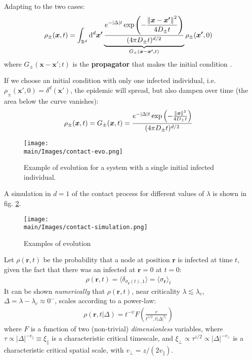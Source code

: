 \documentclass[../../main.tex]{subfiles}
\begin{document}
Adapting to the two cases:
\begin{align*}
    \rho_{\pm}(\bm{x}, t) = \int_{\mathbb{R}^d} \dd[d]{\bm{x'}} \underbrace{\frac{\displaystyle e^{-|\Delta|t} \exp\left(-\frac{\norm{\bm{x} - \bm{x'}}^2}{4 D_\pm t} \right)}{(4 \pi D_\pm t)^{d/2}}}_{G_\pm(\bm{x} - \bm{x'},t)}   \rho_{\pm}(\bm{x'},0)
\end{align*}
where $G_\pm(\bm{x}-\bm{x'};t)$ is the \textbf{propagator} that makes the initial condition .

\medskip

If we choose an initial condition with only one infected individual, i.e. $\rho_{\pm} (\bm{x'}, 0) = \delta^d(\bm{x'})$, the epidemic will spread, but also dampen over time (the area below the curve vanishes):
\begin{align}\label{eqn:contact-sol}
    \rho_{\pm}(\bm{x},t) = G_{\pm}(\bm{x},t) = \frac{e^{-|\Delta|t} \exp\left(-\frac{\norm{\bm{x}}^2}{4 D_{\pm} t} \right)}{(4 \pi D_{\pm} t)^{d/2}} 
\end{align}

\begin{figure}[H]
    \centering
    \texttt{[image: \\main/Images/contact-evo.png]}
    \caption{Example of evolution for a system with a single initial infected individual.}
    \label{fig:contact-evo}
\end{figure}

A simulation in $d=1$ of the contact process for different values of $\lambda$ is shown in fig. \ref{fig:contact-simulation}.

\begin{figure}[H]
    \centering
    \texttt{[image: \\main/Images/contact-simulation.png]}
    \caption{Examples of evolution}
    \label{fig:contact-simulation}
\end{figure}

Let $\rho(\bm{r},t)$ be the probability that a node at position $\bm{r}$ is infected at time $t$, given the fact that there was an infected at $\bm{r}=0$ at $t=0$:
\begin{align*}
    \rho(\bm{r},t) = \langle \delta_{\sigma_{\bm{r}}(t),1} \rangle = \langle \sigma_{\bm{r}} \rangle_t
\end{align*}
It can be shown \textit{numerically} that $\rho(\bm{r},t)$, near criticality $\lambda \lesssim \lambda_c$, $\Delta = \lambda - \lambda_c \approx 0^-$, scales according to a power-law:
\begin{align*}
    \rho(\bm{r},t|\Delta) = t^{-\psi} F\left(\frac{r}{t^{z/2}, t |\Delta|^{v_\parallel}} \right)
\end{align*}  
where $F$ is a function of two (non-trivial) \textit{dimensionless} variables, where $\tau \propto |\Delta|^{-v_\parallel} \equiv \xi_\parallel$ is a characteristic critical timescale, and $\xi_\perp \propto \tau^{z/2} \propto |\Delta|^{-v_\perp}$ is a characteristic critical spatial scale, with $v_\perp = z/(2 v_\parallel)$. %
\end{document}
